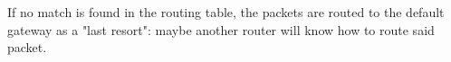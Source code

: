 If no match is found in the routing table, the packets are routed to the default gateway as a "last resort": maybe another router will know how to route said packet.